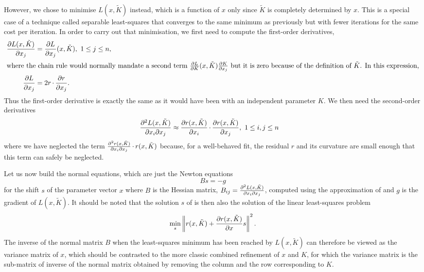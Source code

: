 \documentclass[pdf]{iucr}
\begin{document}
However, we chose to minimise $L(x, \tilde{K})$ instead, which is a function of $x$ only since $\tilde{K}$ is completely determined by $x$. This is a special case of a technique called separable least-squares \cite[, and references therein]{Nielsen:2000fr} that  converges to the same minimum as previously but with fewer iterations for the same cost per iteration. In order to carry out that minimisation, we first need to compute the first-order derivatives,
\begin{align}
\frac{\partial L(x, \tilde{K})}{\partial x_j} &= \frac{\partial L}{\partial x_j}(x, \tilde{K}),\ 1 \le j \le n, \\
\intertext{where the chain rule would normally mandate a second term $\frac{\partial L}{\partial K}(x, \tilde{K})\frac{\partial K}{\partial x_j}$ but it is zero because of the definition of $\tilde{K}$. In this expression,}
\frac{\partial L}{\partial x_j} &= 2 r \operatorname{\cdot} \frac{\partial r}{\partial x_j}.
\end{align}
Thus the first-order derivative is exactly the same as it would have been with an independent parameter $K$. We then need the second-order derivatives
\begin{align}
\frac{\partial^2 L(x, \tilde{K})}{\partial x_i \partial x_j} &\approx \frac{\partial r(x, \tilde{K})}{\partial x_i} \operatorname{\cdot} \frac{\partial r(x, \tilde{K})}{\partial x_j},\ 1 \le i,j \le n
\label{eqn:gaussleastsquares}
\end{align}
where we have neglected the term $\frac{\partial^2 r(x, \tilde{K})}{\partial x_i \partial x_j} \operatorname{\cdot} r(x, \tilde{K})$ because, for a well-behaved fit, the residual $r$ and its curvature are small enough that this term can safely be neglected.

Let us now build the normal equations, which are just the Newton equations 
\begin{equation}
\label{eqn:gaussnewtoneq}
Bs = -g
\end{equation}
for the shift $s$ of the parameter vector $x$ where $B$ is the Hessian matrix, $B_{ij} = \frac{\partial^2 L(x, \tilde{K})}{\partial x_i \partial x_j}$, computed using the approximation of  and $g$ is the gradient of $L(x, \tilde{K})$. It should be noted that the solution $s$ of  is then also the solution of the linear least-squares problem
\begin{equation}
\label{eqn:gaussnewtonaslinearls}
\min_s \left\| r(x, \tilde{K}) + \frac{\partial r(x, \tilde{K})}{\partial x} s \right\|^2.
\end{equation}
The inverse of the normal matrix $B$ when the least-squares minimum has been reached by $L(x, \tilde{K})$ can therefore be viewed as the variance matrix of $x$, which should be contrasted to the more classic combined refinement of $x$ and $K$, for which the variance matrix is the sub-matrix of inverse of the normal matrix obtained by removing the column and the row corresponding to $K$. 
\end{document}
